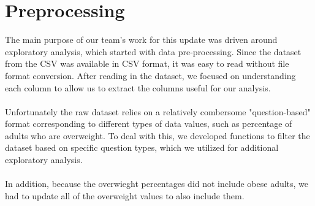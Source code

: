 \documentclass{article}
\begin{document}
	\section{Preprocessing}
		\label{preprocessing}
		The main purpose of our team's work for this update was driven around exploratory analysis, which started with data pre-processing. Since the dataset from the CSV was available in CSV format, it was easy to read without file format conversion. After reading in the dataset, we focused on understanding each column to allow us to extract the columns useful for our analysis. 
		\\\\
		Unfortunately the raw dataset relies on a relatively combersome "question-based" format corresponding to different types of data values, such as percentage of adults who are overweight. To deal with this, we developed functions to filter the dataset based on specific question types, which we utilized for additional exploratory analysis.
		\\\\ 
		In addition, because the overwieght percentages did not include obese adults, we had to update all of the overweight values to also include them.
		
\end{document}
